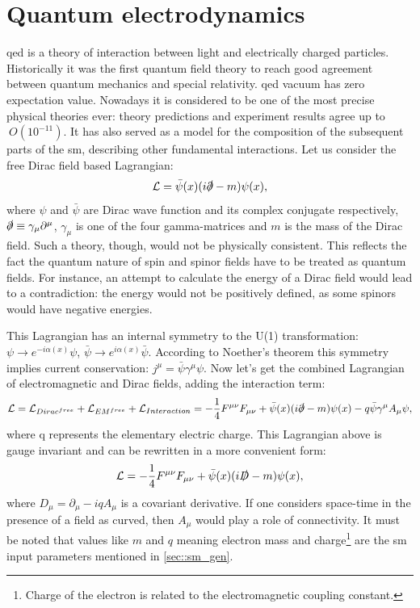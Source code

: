 \section{Quantum electrodynamics}
\label{sec::qed}
\gls{qed} is a theory of interaction between light and electrically charged particles. Historically it was the first quantum field theory to reach good agreement between quantum mechanics and special relativity. \gls{qed} vacuum has zero expectation value.  Nowadays it is considered to be one of the most precise physical theories ever: theory predictions and experiment results agree up to $~O(10^{-11})$. It has also served as a model for the composition of the subsequent parts of the \gls{sm}, describing other fundamental interactions. Let us consider the free Dirac field based Lagrangian:
 \begin{equation}
\mathcal{L} = \bar \psi(x) (i\slashed\partial - m)\psi(x),
\end{equation}
where $\psi$ and $\bar \psi$ are Dirac wave function and its complex conjugate respectively, $\slashed\partial \equiv \gamma_{\mu}\partial^{\mu}$, $\gamma_{\mu}$ is one of the four gamma-matrices and $m$ is the mass of the Dirac field. 
Such a theory, though, would not be physically consistent. This reflects the fact the quantum nature of spin and spinor fields have to be treated as quantum fields. For instance, an attempt to calculate the energy of a Dirac field would lead to a contradiction: the energy would not be positively defined, as some spinors would have negative energies. 

This Lagrangian has an internal symmetry to the U(1) transformation: $\psi\rightarrow e^{-i\alpha(x)}\psi$, \: $\bar\psi\rightarrow e^{i\alpha(x)}\bar\psi$. According to Noether's theorem this symmetry implies current conservation: $j^{\mu}=\bar\psi\gamma^{\mu}\psi$.
Now let's get the combined Lagrangian of electromagnetic and Dirac fields, adding the interaction term:
 \begin{equation}
\mathcal{L} = \mathcal{L}_{Dirac^{free}} + \mathcal{L}_{EM^{free}} + \mathcal{L}_{Interaction} = -\frac{1}{4} F^{\mu \nu}F_{\mu \nu}+\bar \psi(x) (i\slashed\partial -m)\psi(x) - q\bar\psi\gamma^{\mu}A_{\mu}\psi,
\end{equation}
where q represents the elementary electric charge. This Lagrangian above is gauge invariant and can be rewritten in a more convenient form:
 \begin{equation}
\mathcal{L} =  -\frac{1}{4} F^{\mu \nu}F_{\mu \nu}+\bar \psi(x) (i\slashed D -m)\psi(x),
\end{equation}
where $D_{\mu} = \partial_{\mu}-iqA_{\mu}$ is a covariant derivative. If one considers space-time in the presence of a field as curved, then $A_{\mu}$ would play a role of connectivity. It must be noted that values like $m$ and $q$ meaning electron mass and charge\footnote{Charge of the electron is related to the electromagnetic coupling constant.} are the \gls{sm} input parameters mentioned in \ref{sec::sm_gen}.  

